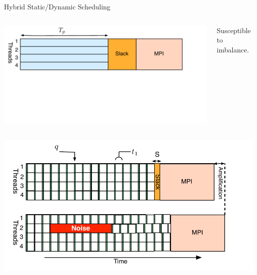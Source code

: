 \begin{frame}[label=hybridstatdyn]{Hybrid Static/Dynamic Scheduling}
\begin{columns}
  \vspace*{-0.2in}
 
% 
 \vspace*{-0.2in}
  \begin{center}
    \includegraphics[scale=0.31]{images/threadedCompRegion-static.pdf}
  \end{center} 
  \vspace*{-0.4in}
  \begin{center} 
    \tiny Susceptible to imbalance.  
  \end{center} 
\end{columns}
\begin{columns}
\vspace*{-0.15in}
%
  \begin{center}
    \includegraphics[scale=0.31]{images/threadedCompRegion-dynamic.pdf}

\end{center}
\end{columns}
\end{frame}
